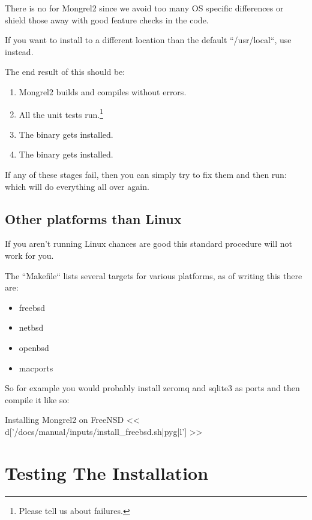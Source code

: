 There is no  for Mongrel2 since we avoid too many OS specific
differences or shield those away with good feature checks in the code.

If you want to install to a different location than the default  ``/usr/local``,
use  instead.

The end result of this should be:

\begin{enumerate}
\item Mongrel2 builds and compiles without errors.
\item All the unit tests run.\footnote{Please tell us about failures.}
\item The  binary gets installed.
\item The  binary gets installed.
\end{enumerate}

If any of these stages fail, then you can simply try to fix them and then
run:   which will do everything all over again.

\subsection{Other platforms than Linux}

If you aren't running Linux chances are good this standard procedure will not work for you.

The ``Makefile`` lists several targets for various platforms, as of writing this there are:

\begin{itemize}
\item freebsd
\item netbsd
\item openbsd
\item macports
\end{itemize}

So for example you would probably install zeromq and sqlite3 as ports and then compile it like so:

\begin{code}{Installing Mongrel2 on FreeNSD}
<< d['/docs/manual/inputs/install_freebsd.sh|pyg|l'] >>
\end{code}

\section{Testing The Installation}

